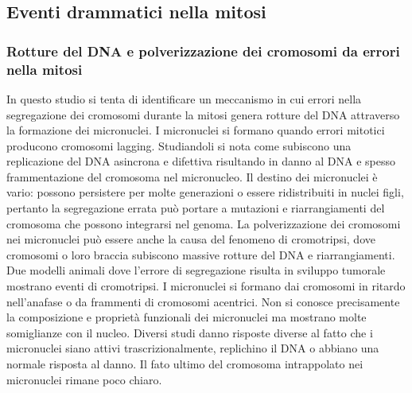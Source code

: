 \subsection{Eventi drammatici nella mitosi}
\subsubsection{Rotture del DNA e polverizzazione dei cromosomi da errori nella mitosi}
In questo studio si tenta di identificare un meccanismo in cui errori nella segregazione dei cromosomi durante la mitosi genera rotture del DNA attraverso la formazione dei micronuclei. 
I micronuclei si formano quando errori mitotici producono cromosomi lagging. Studiandoli si nota come subiscono una replicazione del DNA asincrona e difettiva risultando in danno al
DNA e spesso frammentazione del cromosoma nel micronucleo. Il destino dei micronuclei \`e vario: possono persistere per molte generazioni o essere ridistribuiti in nuclei figli, pertanto
la segregazione errata pu\`o portare a mutazioni e riarrangiamenti del cromosoma che possono integrarsi nel genoma. La polverizzazione dei cromosomi nei micronuclei pu\`o essere anche
la causa del fenomeno di cromotripsi, dove cromosomi o loro braccia subiscono massive rotture del DNA e riarrangiamenti. Due modelli animali dove l'errore di segregazione risulta in 
sviluppo tumorale mostrano eventi di cromotripsi. I micronuclei si formano dai cromosomi in ritardo nell'anafase o da frammenti di cromosomi acentrici. Non si conosce precisamente la
composizione e propriet\`a funzionali dei micronuclei ma mostrano molte somiglianze con il nucleo. Diversi studi danno risposte diverse al fatto che i micronuclei siano attivi 
trascrizionalmente, replichino il DNA o abbiano una normale risposta al danno. Il fato ultimo del cromosoma intrappolato nei micronuclei rimane poco chiaro. 
